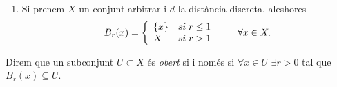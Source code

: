 \documentclass[../main.tex]{subfiles}
\begin{document}
\begin{ej}
\begin{enumerate}[(1)]
    
    \item Si prenem $X$ un conjunt arbitrar i $d$ la distància discreta, aleshores
    \begin{equation}
        \notag
        B_r(x) = \left\{
        \begin{array}{ll}
            \{x\} & si\;r\leq 1\\
            X & si\;r>1
        \end{array}
        \right.\qquad \forall x\in X.
    \end{equation}
\end{enumerate}
\end{ej}


\begin{defi}
\label{def:obertem} Direm que un subconjunt $U\subset X$ és \textit{obert} si i només si $\forall x\in U$ $\exists r>0$ tal que $B_r(x)\subseteq U$.
\end{defi}
\end{document}
